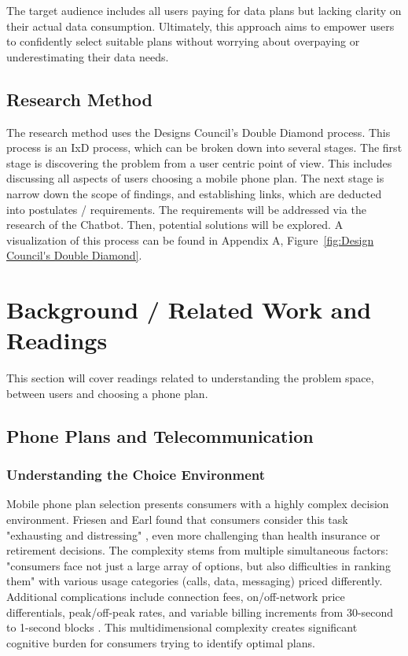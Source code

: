 \documentclass[conference]{IEEEtran}
\begin{document}
The target audience includes all users paying for data plans but lacking clarity on their actual data consumption. Ultimately, this approach aims to empower users to confidently select suitable plans without worrying about overpaying or underestimating their data needs.
\subsection{Research Method}
The research method uses the Designs Council's Double Diamond process. This process is an IxD process, which can be broken down into several stages. The first stage is discovering the problem from a user centric point of view. This includes discussing all aspects of users choosing a mobile phone plan. The next stage is narrow down the scope of findings, and establishing links, which are deducted into postulates / requirements. The requirements will be addressed via the research of the Chatbot. Then, potential solutions will be explored. A visualization of this process can be found in Appendix A, Figure~\ref{fig:Design Council's Double Diamond}.

\section{Background / Related Work and Readings}
This section will cover readings related to understanding the problem space, between users and choosing a phone plan. 
\subsection{Phone Plans and Telecommunication}
\subsubsection{Understanding the Choice Environment}
Mobile phone plan selection presents consumers with a highly complex decision environment. Friesen and Earl found that consumers consider this task "exhausting and distressing" \cite{b1}, even more challenging than health insurance or retirement decisions. The complexity stems from multiple simultaneous factors: "consumers face not just a large array of options, but also difficulties in ranking them" \cite{b1} with various usage categories (calls, data, messaging) priced differently. Additional complications include connection fees, on/off-network price differentials, peak/off-peak rates, and variable billing increments from 30-second to 1-second blocks \cite{b1}. This multidimensional complexity creates significant cognitive burden for consumers trying to identify optimal plans.
\end{document}
